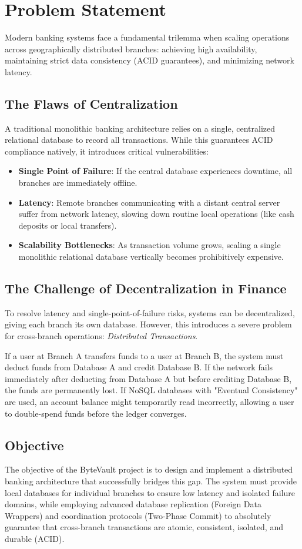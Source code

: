 \section{Problem Statement}

Modern banking systems face a fundamental trilemma when scaling operations across geographically distributed branches: achieving high availability, maintaining strict data consistency (ACID guarantees), and minimizing network latency. 

\subsection{The Flaws of Centralization}
A traditional monolithic banking architecture relies on a single, centralized relational database to record all transactions. While this guarantees ACID compliance natively, it introduces critical vulnerabilities:
\begin{itemize}
    \item \textbf{Single Point of Failure}: If the central database experiences downtime, all branches are immediately offline.
    \item \textbf{Latency}: Remote branches communicating with a distant central server suffer from network latency, slowing down routine local operations (like cash deposits or local transfers).
    \item \textbf{Scalability Bottlenecks}: As transaction volume grows, scaling a single monolithic relational database vertically becomes prohibitively expensive.
\end{itemize}

\subsection{The Challenge of Decentralization in Finance}
To resolve latency and single-point-of-failure risks, systems can be decentralized, giving each branch its own database. However, this introduces a severe problem for cross-branch operations: \textit{Distributed Transactions}.

If a user at Branch A transfers funds to a user at Branch B, the system must deduct funds from Database A and credit Database B. If the network fails immediately after deducting from Database A but before crediting Database B, the funds are permanently lost. If NoSQL databases with "Eventual Consistency" are used, an account balance might temporarily read incorrectly, allowing a user to double-spend funds before the ledger converges.

\subsection{Objective}
The objective of the ByteVault project is to design and implement a distributed banking architecture that successfully bridges this gap. The system must provide local databases for individual branches to ensure low latency and isolated failure domains, while employing advanced database replication (Foreign Data Wrappers) and coordination protocols (Two-Phase Commit) to absolutely guarantee that cross-branch transactions are atomic, consistent, isolated, and durable (ACID).
